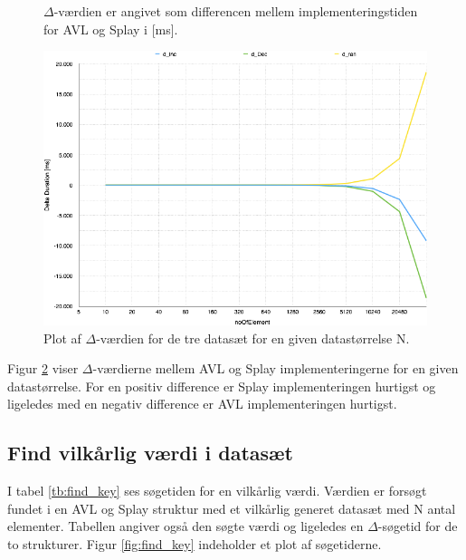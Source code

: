 \begin{figure}[th!]
\centering
{}
\captionsetup{type=table}
\caption{\(\Delta\)-værdien er angivet som differencen mellem implementeringstiden for AVL og Splay i [ms].}
\label{tb:delta_balance}
\end{figure}
\begin{figure}[th!]
\centering
\includegraphics[width=.8\textwidth]{./graphics/delta_balance}
\caption{Plot af \(\Delta\)-værdien for de tre datasæt for en given datastørrelse N.}
\label{fig:delta_balance}
\end{figure}

Figur \ref{fig:delta_balance} viser \(\Delta\)-værdierne mellem AVL og Splay implementeringerne for en given datastørrelse. For en positiv difference er Splay implementeringen hurtigst og ligeledes med en negativ difference er AVL implementeringen hurtigst.
	
\subsection{Find vilkårlig værdi i datasæt}
\label{subsec:find}
I tabel \ref{tb:find_key} ses søgetiden for en vilkårlig værdi. Værdien er forsøgt fundet i en AVL og Splay struktur med et vilkårlig generet datasæt med N antal elementer. Tabellen angiver også den søgte værdi og ligeledes en \(\Delta\)-søgetid for de to strukturer. Figur \ref{fig:find_key} indeholder et plot af søgetiderne.

